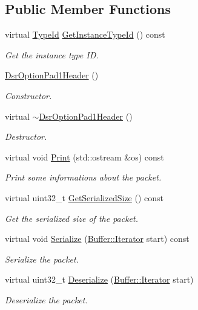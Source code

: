 \subsection*{Public Member Functions}
\begin{DoxyCompactItemize}
\item 
virtual \hyperlink{classns3_1_1TypeId}{Type\+Id} \hyperlink{classns3_1_1dsr_1_1DsrOptionPad1Header_aad101395b77af8a8fa136b1784eafdc5}{Get\+Instance\+Type\+Id} () const 
\begin{DoxyCompactList}\small\item\em Get the instance type ID. \end{DoxyCompactList}\item 
\hyperlink{classns3_1_1dsr_1_1DsrOptionPad1Header_ac714c57701bb982cb364a9c2bf651cc9}{Dsr\+Option\+Pad1\+Header} ()
\begin{DoxyCompactList}\small\item\em Constructor. \end{DoxyCompactList}\item 
virtual \hyperlink{classns3_1_1dsr_1_1DsrOptionPad1Header_a12f1c112ffdaff6d3b69e19fbf6e2eaf}{$\sim$\+Dsr\+Option\+Pad1\+Header} ()
\begin{DoxyCompactList}\small\item\em Destructor. \end{DoxyCompactList}\item 
virtual void \hyperlink{classns3_1_1dsr_1_1DsrOptionPad1Header_a9d9dbc27e8741e98f2b4b4fa0ce2dbce}{Print} (std\+::ostream \&os) const 
\begin{DoxyCompactList}\small\item\em Print some informations about the packet. \end{DoxyCompactList}\item 
virtual uint32\+\_\+t \hyperlink{classns3_1_1dsr_1_1DsrOptionPad1Header_a1e085e6aa70df73164348e1de9efe59a}{Get\+Serialized\+Size} () const 
\begin{DoxyCompactList}\small\item\em Get the serialized size of the packet. \end{DoxyCompactList}\item 
virtual void \hyperlink{classns3_1_1dsr_1_1DsrOptionPad1Header_a6055a32eb4b386b5c4343d352aebe0ba}{Serialize} (\hyperlink{classns3_1_1Buffer_1_1Iterator}{Buffer\+::\+Iterator} start) const 
\begin{DoxyCompactList}\small\item\em Serialize the packet. \end{DoxyCompactList}\item 
virtual uint32\+\_\+t \hyperlink{classns3_1_1dsr_1_1DsrOptionPad1Header_ab040965b45b9e8d3485110e5dba1894f}{Deserialize} (\hyperlink{classns3_1_1Buffer_1_1Iterator}{Buffer\+::\+Iterator} start)
\begin{DoxyCompactList}\small\item\em Deserialize the packet. \end{DoxyCompactList}\end{DoxyCompactItemize}
